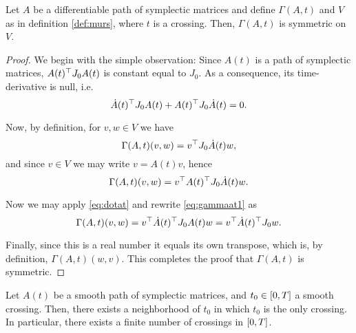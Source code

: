 \begin{lemma}\label{lemma:rs1}
Let $A$ be a differentiable path of symplectic matrices and define $\Gamma(A,t)$ and $V$ as in definition \ref{def:murs}, where $t$ is a crossing. Then, $\Gamma(A,t)$ is symmetric on $V$.
\end{lemma}

\begin{proof}
We begin with the simple observation: Since $A(t)$ is a path of symplectic matrices, $A(t)^\top J_0 A(t)$ is constant equal to $J_0$. As a consequence, its time-derivative is null, i.e.
\begin{equation}\label{eq:dotat}
\dot A(t)^\top J_0 A(t) + A(t)^\top J_0 \dot A(t) = 0.
\end{equation}

Now, by definition, for $v,w \in V$ we have
\begin{equation}
\Gamma(A,t)(v,w) = v^\top J_0 \dot A(t) w,
\end{equation}
and since $v \in V$ we may write $v = A(t) v$, hence
\begin{equation}\label{eq:gammaat1}
\Gamma(A,t)(v,w) = v^\top A(t)^\top J_0 \dot A(t) w.
\end{equation}

Now we may apply \eqref{eq:dotat} and rewrite \eqref{eq:gammaat1} as
\begin{equation}
\Gamma(A,t)(v,w) = v^\top \dot A(t)^\top J_0 A(t) w = v^\top \dot A(t)^\top J_0 w.
\end{equation}

Finally, since this is a real number it equals its own transpose, which is, by definition, $\Gamma(A,t)(w,v)$. This completes the proof that $\Gamma(A,t)$ is symmetric.
\end{proof}

\begin{lemma}
Let $A(t)$ be a smooth path of symplectic matrices, and $t_0 \in \interval0T$ a smooth crossing. Then, there exists a neighborhood of $t_0$ in which $t_0$ is the only crossing. In particular, there exists a finite number of crossings in $\interval0T$.
\end{lemma}

